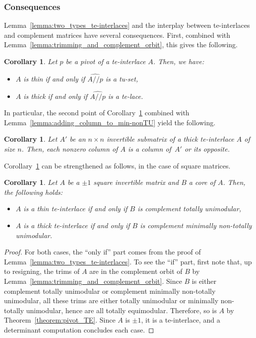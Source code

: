 \documentclass[11pt,a4paper]{amsart}
\theoremstyle{plain}
\newtheorem{corollary}[theorem]{Corollary}
\theoremstyle{definition}
\newcommand{\trim}{/\!\!/}
\begin{document}
\subsubsection{Consequences}
Lemma~\ref{lemma:two_types_te-interlaces} and the interplay between te-interlaces and complement matrices have several consequences.
First, combined with Lemma~\ref{lemma:trimming_and_complement_orbit}, this gives the following.
\begin{corollary}\label{corollary:trim_te-interlace}
Let $p$ be a pivot of a te-interlace $A$. Then, we have:
\begin{itemize}
\item $A$ is thin if and only if $\widehat{A\trim p}$ is a tu-set,
\item $A$ is thick if and only if $\widehat{A\trim p}$ is a te-lace.
\end{itemize}
\end{corollary}
In particular, the second point of Corollary~\ref{corollary:trim_te-interlace} combined with Lemma~\ref{lemma:adding_column_to_min-nonTU} yield the following.
\begin{corollary}\label{corollary:form-thick-te-inter}
Let $A'$ be an $n\times n$ invertible submatrix of a thick te-interlace $A$ of size $n$. Then, each nonzero column of $A$ is a column of~$A'$ or its opposite.
\end{corollary}
Corollary~\ref{corollary:trim_te-interlace} can be strengthened as follows, in the case of square matrices.
\begin{corollary}\label{corollary:interlace_core}
Let $A$ be a $\pm1$ square invertible matrix and $B$ a core of $A$. Then, the following holds:
\begin{itemize}
\item[\textbullet] $A$ is a thin te-interlace if and only if $B$ is complement totally unimodular,
\item[\textbullet] $A$ is a thick te-interlace if and only if $B$ is complement minimally non-totally unimodular.
\end{itemize}
\end{corollary}
\begin{proof}
For both cases, the ``only if'' part comes from the proof of Lemma~\ref{lemma:two_types_te-interlaces}. To see the ``if'' part, first note that, up to resigning, the trims of $A$ are in the complement orbit of $B$ by Lemma~\ref{lemma:trimming_and_complement_orbit}.
Since $B$ is either complement totally unimodular or complement minimally non-totally unimodular, all these trims are either totally unimodular or minimally non-totally unimodular, hence are all totally equimodular.
Therefore, so is $A$ by Theorem~\ref{theorem:pivot_TE}.
Since $A$ is $\pm1$, it is a te-interlace, and a determinant computation concludes each case.
\end{proof}
\end{document}

